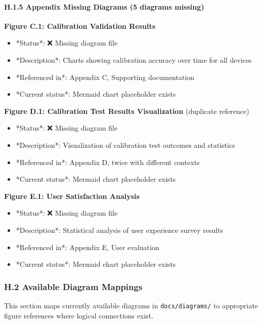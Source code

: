 \documentclass[11pt,a4paper]{article}
\begin{document}
{{\begin{itemize}
\end{itemize}
\paragraph{H.1.5 Appendix Missing Diagrams (5 diagrams missing)}

\textbf{Figure C.1: Calibration Validation Results}

\begin{itemize}
\item *Status*: ❌ Missing diagram file
\item *Description*: Charts showing calibration accuracy over time for all devices
\item *Referenced in*: Appendix C, Supporting documentation
\item *Current status*: Mermaid chart placeholder exists

\end{itemize}
\textbf{Figure D.1: Calibration Test Results Visualization} (duplicate reference)

\begin{itemize}
\item *Status*: ❌ Missing diagram file
\item *Description*: Visualization of calibration test outcomes and statistics
\item *Referenced in*: Appendix D, twice with different contexts
\item *Current status*: Mermaid chart placeholder exists

\end{itemize}
\textbf{Figure E.1: User Satisfaction Analysis}

\begin{itemize}
\item *Status*: ❌ Missing diagram file
\item *Description*: Statistical analysis of user experience survey results
\item *Referenced in*: Appendix E, User evaluation
\item *Current status*: Mermaid chart placeholder exists

\end{itemize}
\subsubsection{H.2 Available Diagram Mappings}

This section maps currently available diagrams in \texttt{docs/diagrams/} to appropriate figure references where logical
connections exist.

}}
\end{document}
